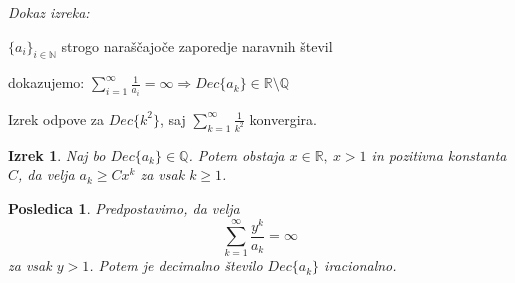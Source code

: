 \documentclass{beamer}
\def\N{\mathbb{N}} %
\def\Q{\mathbb{Q}} %
\def\R{\mathbb{R}} %
\newtheorem{izrek}{Izrek}
\newtheorem{posledica}{Posledica}
\begin{document}
\begin{frame}
    \emph{Dokaz izreka:}
    
    $\{a_i\}_{i \in \N}$ strogo naraščajoče zaporedje naravnih števil
    
    dokazujemo: $\sum_{i=1}^{\infty} \frac{1}{a_i} = \infty \Rightarrow Dec\{a_k\} \in \R \setminus\Q$
    \newline
    \newline
    \newline
    \newline
    \newline
    \newline
    \newline
    \newline
    \newline
    \newline
    \newline
    \newline
    \newline
    \newline
    \newline
    \newline
\end{frame}

\begin{frame}

    Izrek odpove za $Dec\{k^2\}$, saj $\sum_{k=1}^{\infty}\frac{1}{k^2}$ konvergira.
    \pause

    \begin{izrek}
        Naj bo $Dec\{a_k\} \in \Q$. Potem obstaja $x \in \R, \ x > 1$ in pozitivna konstanta $C$,
        da velja $a_k \geq Cx^k$ za vsak $k \geq 1$.
    \end{izrek}
    \pause


    \begin{posledica}\label{posledica}
        Predpostavimo, da velja
        \[
            \sum_{k=1}^{\infty}\frac{y^k}{a_k} = \infty\]
        za vsak $y > 1$. Potem je decimalno število $Dec\{a_k\}$ iracionalno.
    \end{posledica}

\end{frame}
\end{document}
